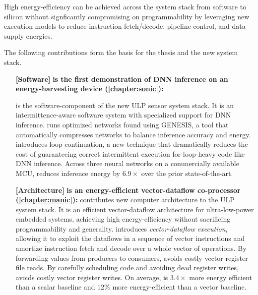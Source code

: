 \begin{adjustwidth}{1cm}{1cm}
High energy-efficiency can be achieved 
across the system stack from software to silicon without signficantly compromising on programmability by leveraging new execution models to reduce instruction fetch/decode, pipeline-control, and data supply energies.
% 

\end{adjustwidth}
% 
The following contributions form the basis for the thesis and the new system stack.

\begin{itemize}

\item[\textbf{[Software]}]
\textbf{\sonic is the first demonstration of DNN inference on an energy-harvesting device (\autoref{chapter:sonic}): }

\sonic is the software-component of the new ULP sensor system stack.
% 
It is an intermittence-aware software system with specialized support for DNN inference. 
% 
\sonic runs optimized networks found using GENESIS, a tool that automatically compresses networks to balance inference accuracy and energy.
% 
\sonic introduces loop continuation, a new technique that dramatically reduces the cost of guaranteeing correct intermittent execution for loop-heavy code like DNN inference. 
% 
Across three neural networks on a commercially available MCU, \sonic reduces inference energy by $6.9\times$ over the prior state-of-the-art.

\item[\textbf{[Architecture]}]
\textbf{\manic is an energy-efficient vector-dataflow co-processor (\autoref{chapter:manic}): }
\manic contributes new computer architecture to the ULP system stack.
% 
It is an efficient vector-dataflow architecture for ultra-low-power embedded systems, achieving high energy-efficiency without sacrificing programmability and generality.
% 
\manic introduces \emph{vector-dataflow execution}, allowing it to exploit the
dataflows in a sequence of vector instructions and amortize instruction
fetch and decode over a whole vector of operations.
%
By forwarding values from producers to consumers, \manic avoids costly vector register file reads.
% 
By carefully scheduling code and avoiding dead register writes, \manic avoids costly vector register writes.
% 
On average, \manic is $3.4\times$ more energy efficient than a scalar baseline and $12\%$ more energy-efficient than a vector baseline.


\end{itemize}
